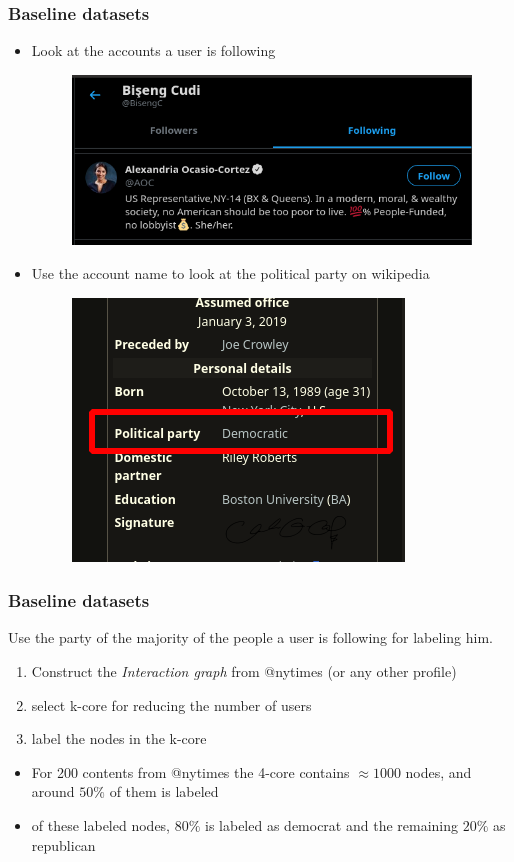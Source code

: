 \documentclass{beamer}
\begin{document}
\begin{frame}[c]
	\frametitle{Baseline datasets}
	\begin{itemize}
		\item Look at the accounts a user is following
		      \begin{figure}[htpb]
			      \centering
			      \includegraphics[width=0.6\linewidth]{img/following_cortez.png}
		      \end{figure}
		\item Use the account name to look at the political party on
		      wikipedia

		      \begin{figure}[htpb]
			      \centering
			      \includegraphics[width=0.4\linewidth]{img/cortez_wikipedia.png}
		      \end{figure}

	\end{itemize}
\end{frame}

\begin{frame}[c]
	\frametitle{Baseline datasets}
	Use the party of the majority of the people a user is following for
	labeling him.

	\begin{enumerate}
		\item Construct the \emph{Interaction graph} from @nytimes (or any other
		      profile)
		\item select k-core for reducing the number of users
		\item label the nodes in the k-core
	\end{enumerate}

	\begin{itemize}
		\item For 200 contents from @nytimes the 4-core contains $\approx 1000$
		      nodes, and around $50 \%$ of them is labeled
		\item of these labeled nodes, $80 \%$ is labeled as democrat and
		      the remaining $20 \%$ as republican
	\end{itemize}

\end{frame}
\end{document}
